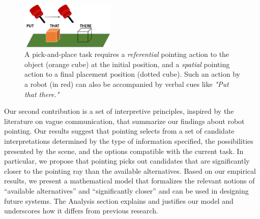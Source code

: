 \begin{figure}[t]
    \centering
    \includegraphics[width=0.4\textwidth, trim={0 0.3in 0 0in},clip]{figures/putthatthere2.png}
    \caption{A pick-and-place task requires a \textit{referential} pointing action to the object (orange cube) at the initial position, and a \textit{spatial} pointing action to a final placement position (dotted cube). Such an action by a robot (in red) can also be accompanied by verbal cues like \textit{"Put that there."}}
    \label{fig:pap}
\end{figure}

Our second contribution is a set of interpretive principles, inspired by the literature on vague communication, that summarize our findings about robot pointing.  Our results suggest that pointing selects from a set of candidate interpretations determined by the type of information specified, the possibilities presented by the scene, and the options compatible with the current task.  In particular, we propose that pointing picks out candidates that are significantly closer to the pointing ray than the available alternatives.  Based on our empirical results, we present a mathematical model that formalizes the relevant notions of ``available alternatives'' and ``significantly closer'' and can be used in designing future systems.  The Analysis section explains and justifies our model and underscores how it differs from previous research.





